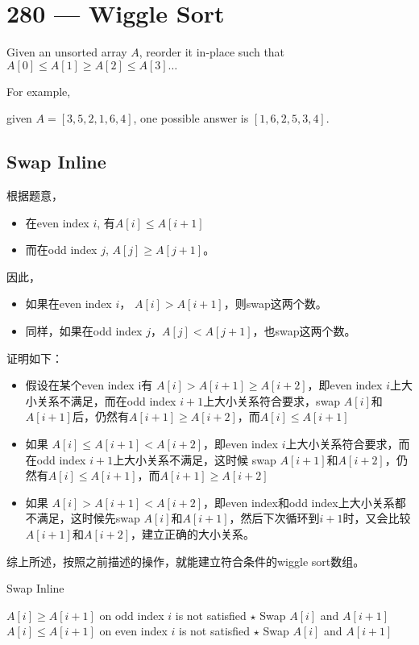  \section{280 --- Wiggle Sort}
Given an unsorted array $A$, reorder it in-place such that $A[0] \leq A[1] \geq A[2] \leq A[3] \ldots$
\par
For example, 
\par
given $A = [3, 5, 2, 1, 6, 4]$, one possible answer is $[1, 6, 2, 5, 3, 4]$.
\subsection{Swap Inline}
根据题意，
\begin{itemize}
    \item 在even index $i$, 有$A[i]\leq A[i+1]$
    \item 而在odd index $j$, $A[j]\geq A[j+1]$。
\end{itemize}
因此，
\begin{itemize}
    \item 如果在even index $i$， $A[i]> A[i+1]$，则swap这两个数。
    \item 同样，如果在odd index $j$，$A[j]< A[j+1]$，也swap这两个数。
\end{itemize}
证明如下：
\begin{itemize}
    \item 假设在某个even index i有
$A[i]>A[i+1]\geq A[i+2]$，即even index $i$上大小关系不满足，而在odd index $i+1$上大小关系符合要求，swap $A[i]$和$A[i+1]$后，仍然有$A[i+1] \geq A[i+2]$，而$A[i]\leq A[i+1]$
\item 如果
$A[i]\leq A[i+1]<A[i+2]$，即even index $i$上大小关系符合要求，而在odd index $i+1$上大小关系不满足，这时候
swap $A[i+1]$和$A[i+2]$，仍然有$A[i]\leq A[i+1]$，而$A[i+1]\geq A[i+2]$
\item 如果
$A[i]>A[i+1]<A[i+2]$，即even index和odd index上大小关系都不满足，这时候先swap $A[i]$和$A[i+1]$，然后下次循环到$i+1$时，又会比较$A[i+1]$和$A[i+2]$，建立正确的大小关系。
\end{itemize}
综上所述，按照之前描述的操作，就能建立符合条件的wiggle sort数组。
\setcounter{algorithm}{0}
\begin{algorithm}[H]
\caption{Swap Inline}
\begin{algorithmic}[1]
\end{algorithmic}
\end{algorithm}
\begin{algorithm}[H]
\begin{algorithmic}[1]
 \Comment $A[i]\geq A[i+1]$ on odd index $i$ is not satisfied
\State $\star$ Swap $A[i]$ and $A[i+1]$
 \Comment $A[i]\leq A[i+1]$ on even index $i$ is not satisfied
\State $\star$ Swap $A[i]$ and $A[i+1]$
\EndIf
\EndFor
\EndProcedure
\end{algorithmic}
\end{algorithm}
